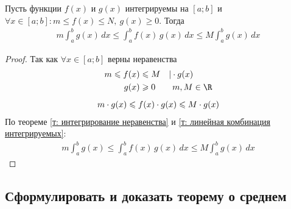 \begin{theorem}
    Пусть функции $f(x)$ и $g(x)$ интегрируемы на $[a;b]$ и $\forall x \in [a;b]\colon m \leqslant f(x) \leqslant N,\ {g(x) \geqslant 0}$. Тогда
    \begin{gather*}
        \boxed{m \int_{a}^{b} g(x)\, dx \leqslant \int_{a}^{b} f(x)\, g(x)\, dx \leqslant M \int_{a}^{b} g(x)\, dx}
    \end{gather*}
\end{theorem}
\begin{proof}
    Так как $\forall x \in [a;b]$ верны неравенства
    \begin{gather*}
        \begin{aligned}
            m \leqslant f(x) &\leqslant M\quad | \cdot g(x) \\
            g(x) &\geqslant 0\qquad m, M \in \R
        \end{aligned} \\[1ex]
        m\cdot g(x) \leqslant f(x)\cdot g(x) \leqslant M \cdot g(x)
    \end{gather*}
    По теореме \ref{т: интегрирование неравенства} и \ref{т: линейная комбинация интегрируемых}:
    \begin{gather*}
        m \int_{a}^{b} g(x) \leqslant \int_{a}^{b} f(x)\, g(x)\, dx \leqslant M \int_{a}^{b} g(x)\, dx
    \end{gather*}
\end{proof}

\subsection{Сформулировать и доказать теорему о среднем}

